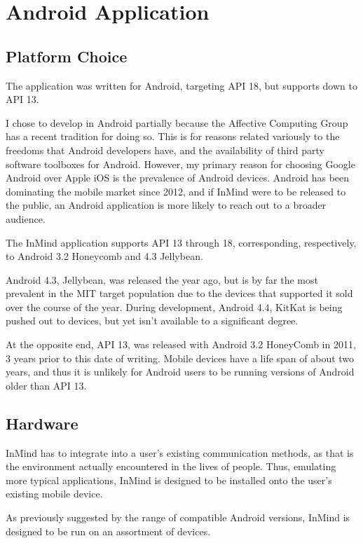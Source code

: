   \section{Android Application}

    \subsection{Platform Choice}
    The application was written for Android, targeting API 18,
    but supports down to API 13.

    I chose to develop in Android partially because the Affective Computing Group
    has a recent tradition for doing so.
    This is for reasons related variously to the freedoms that Android developers have,
    and the availability of third party software toolboxes for Android.
    However, my primary reason for choosing Google Android over Apple iOS is
    the prevalence of Android devices.
    Android has been dominating the mobile market since 2012,
    and if InMind were to be released to the public,
    an Android application is more likely to reach out to a broader audience.

    The InMind application supports API 13 through 18, 
    corresponding, respectively, to Android 3.2 Honeycomb and 4.3 Jellybean.

    Android 4.3, Jellybean, was released the year ago, but is by far
    the most prevalent in the MIT target population due to the devices
    that supported it sold over the course of the year.
    During development, Android 4.4, KitKat is being pushed out to devices,
    but yet isn't available to a significant degree.

    At the opposite end, API 13, was released with Android 3.2 HoneyComb
    in 2011, 3 years prior to this date of writing.
    Mobile devices have a life span of about two years,
    and thus it is unlikely for Android users to be
    running versions of Android older than API 13.

    \subsection{Hardware}
    InMind has to integrate into a user's existing communication methods,
    as that is the environment actually encountered in the lives of people.
    Thus, emulating more typical applications,
    InMind is designed to be installed onto the user's existing mobile device.

    As previously suggested by the range of compatible Android versions,
    InMind is designed to be run on an assortment of devices.
    
